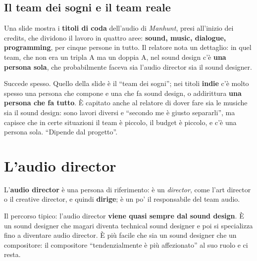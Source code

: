 \subsection{Il team dei sogni e il team reale}

Una slide mostra i \textbf{titoli di coda} dell'audio di \emph{Manhunt}, presi
all'inizio dei credits, che dividono il lavoro in quattro aree: \textbf{sound,
music, dialogue, programming}, per cinque persone in tutto. Il relatore nota un
dettaglio: in quel team, che non era un tripla A ma un doppia A, nel sound
design c'è \textbf{una persona sola}, che probabilmente faceva sia l'audio
director sia il sound designer.

Succede spesso. Quello della slide è il ``team dei sogni''; nei titoli
\textbf{indie} c'è molto spesso una persona che compone e una che fa sound
design, o addirittura \textbf{una persona che fa tutto}. È capitato anche al
relatore di dover fare sia le musiche sia il sound design: sono lavori diversi e
``secondo me è giusto separarli'', ma capisce che in certe situazioni il team è
piccolo, il budget è piccolo, e c'è una persona sola. ``Dipende dal progetto''.

\section{L'audio director}
\label{z9:sec:director}

L'\textbf{audio director} è una persona di riferimento: è un \emph{director},
come l'art director o il creative director, e quindi \textbf{dirige}; è un po' il
responsabile del team audio.

Il percorso tipico: l'audio director \textbf{viene quasi sempre dal sound
design}. È un sound designer che magari diventa technical sound designer e poi si
specializza fino a diventare audio director. È più facile che sia un sound
designer che un compositore: il compositore ``tendenzialmente è più
affezionato'' al suo ruolo e ci resta.


